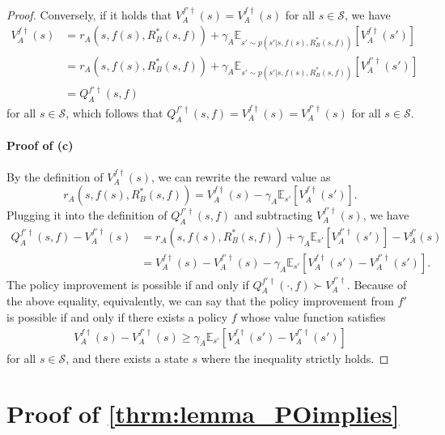 \documentclass{acml}
\providecommand{\E}{\mathbb{E}} %
\begin{document}
\begin{proof}
	Conversely, if it holds that $V_A^{f'\dag}(s)=V_A^{f\dag}(s)$ for all $s\in\mathcal{S}$, we have
	\begin{subequations}
		\begin{align}
			V_A^{f\dag}(s)&=r_A(s,f(s),R_B^*(s,f))+\gamma_A\E_{s'\sim p(s'|s,f(s),R_B^*(s,f))}\left[V_A^{f\dag}(s')\right]\\
			&=r_A(s,f(s),R_B^*(s,f))+\gamma_A\E_{s'\sim p(s'|s,f(s),R_B^*(s,f))}\left[V_A^{f'\dag}(s')\right]\\
			&=Q_A^{f'\dag}(s,f)
		\end{align}
	\end{subequations}
	for all $s\in\mathcal{S}$, which follows that $Q_A^{f'\dag}(s,f)=V_A^{f\dag}(s)=V_A^{f'\dag}(s)$ for all $s\in\mathcal{S}$.
	
	\paragraph{Proof of (c)} By the definition of $V_A^{f\dag}(s)$, we can rewrite the reward value as
	\begin{equation}
		r_A(s,f(s),R_B^*(s,f)) = V_A^{f\dag}(s) - \gamma_A\E_{s'}\left[V_A^{f\dag}(s')\right].
	\end{equation}
	Plugging it into the definition of $Q_A^{f'\dag}(s,f)$ and subtracting $V_A^{f'\dag}(s)$, we have
	\begin{align}
		Q_A^{f'\dag}(s,f) - V_A^{f'\dag}(s)
		&= r_A(s,f(s),R_B^*(s,f)) + \gamma_A\E_{s'}\left[V_A^{f'\dag}(s')\right] - V_A^{f'}(s) \\
		&= V_A^{f\dag}(s) - V_A^{f'\dag}(s) - \gamma_A\E_{s'}\left[V_A^{f\dag}(s') - V_A^{f'\dag}(s')\right] .
	\end{align}
	The policy improvement is possible if and only if $Q_A^{f'\dag}(\cdot,f) \succ V_A^{f'\dag}$.
	Because of the above equality, equivalently, we can say that the policy improvement from $f'$ is possible if and only if there exists a policy $f$ whose value function satisfies
	\begin{align}
		V_A^{f\dag}(s) - V_A^{f'\dag}(s) \ge \gamma_A\E_{s'}\left[V_A^{f\dag}(s') - V_A^{f'\dag}(s')\right] 
	\end{align}
	for all $s \in \mathcal{S}$, and there exists a state $s$ where the inequality strictly holds.
\end{proof}


\section{Proof of \texorpdfstring{\cref{thrm:lemma_POimplies}}{Lg}}\label{apdx:lemma_POimplies}
\end{document}
